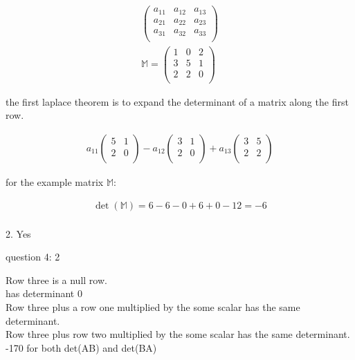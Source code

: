 \documentclass{article}
\begin{document}
\begin{align}
    \begin{pmatrix}
        a_11 & a_12 & a_13 \\
        a_21 & a_22 & a_23 \\
        a_31 & a_32 & a_33 \\
    \end{pmatrix} \\
    \mathbb{M} =
    \begin{pmatrix}
        1 & 0 & 2 \\
        3 & 5 & 1 \\
        2 & 2 & 0 \\
    \end{pmatrix}
\end{align}

the first laplace theorem is to expand the determinant of a matrix along the first row.

\begin{align}
    a_11 \begin{pmatrix}
             5 & 1 \\
             2 & 0 \\
         \end{pmatrix}
    - a_12 \begin{pmatrix}
               3 & 1 \\
               2 & 0 \\
           \end{pmatrix}
    + a_13 \begin{pmatrix}
               3 & 5 \\
               2 & 2 \\
           \end{pmatrix}
\end{align}

for the example matrix $\mathbb{M}$:

\begin{align}
    \det(\mathbb{M}) = 6 - 6 - 0 + 6 + 0 - 12 = -6 \\
\end{align}

2. Yes

question 4: 2

Row three is a null row. \\
has determinant 0 \\
Row three plus a row one multiplied by the some scalar has the same determinant. \\
Row three plus row two multiplied by the some scalar has the same determinant. \\
-170 \textrm{for both det(}AB\textrm{) and det(}BA\textrm{)}
\end{document}
